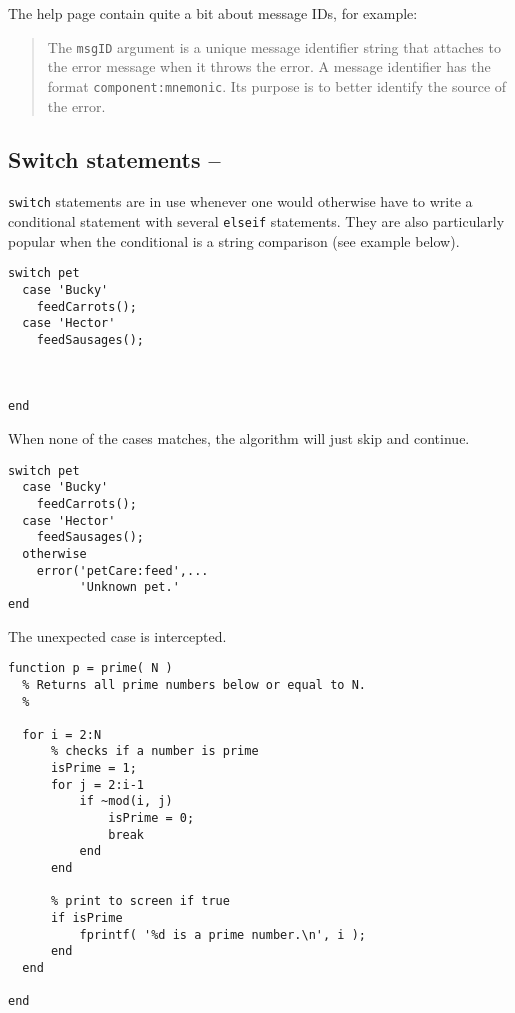 The \matlab{} help page contain quite a bit about message IDs, for example:
\begin{quotation}
The \lstinline!msgID! argument is a unique message identifier string that \matlab{} attaches to the error message when it throws the error. A message identifier has the format \lstinline!component:mnemonic!. Its purpose is to better identify the source of the error.
\end{quotation}


\subsection{Switch statements -- \cleansymbol\cleansymbol}

\lstinline!switch! statements are in use whenever one would otherwise have to write a conditional statement with several \lstinline!elseif! statements. They are also particularly popular when the conditional is a string comparison (see example below).

\hfill
\begin{minipage}[t]{.45\textwidth}
\begin{lstlisting}[framerule=2pt,rulecolor=\color{badred}]
switch pet
  case 'Bucky'
    feedCarrots();
  case 'Hector'
    feedSausages();



end
\end{lstlisting}
When none of the cases matches, the algorithm will just skip and continue.
\end{minipage}
\hfill
\begin{minipage}[t]{.45\textwidth}
\begin{lstlisting}[framerule=2pt,rulecolor=\color{goodgreen}]
switch pet
  case 'Bucky'
    feedCarrots();
  case 'Hector'
    feedSausages();
  otherwise
    error('petCare:feed',...
          'Unknown pet.'
end
\end{lstlisting}
The unexpected case is intercepted.
\end{minipage}
\hfill



\begin{lstlisting}[framerule=2pt,rulecolor=\color{goodgreen},float,caption={The same code as in listing~\ref{listing:prime1}, with rules of style applied. It should now be somewhat easier to maintain and improve the code. Do you have ideas how to speed it up?}]
function p = prime( N )
  % Returns all prime numbers below or equal to N.
  %

  for i = 2:N
      % checks if a number is prime
      isPrime = 1;
      for j = 2:i-1
          if ~mod(i, j)
              isPrime = 0;
              break
          end
      end

      % print to screen if true
      if isPrime
          fprintf( '%d is a prime number.\n', i );
      end
  end

end
\end{lstlisting}
